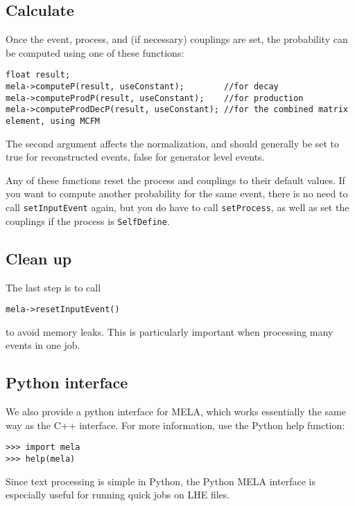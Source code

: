 \documentclass[aps,superscriptaddress,nofootinbib]{revtex4}
\begin{document}
\subsection{Calculate}
Once the event, process, and (if necessary) couplings are set, the probability can be computed using one of these functions:
\begin{verbatim}
float result;
mela->computeP(result, useConstant);        //for decay
mela->computeProdP(result, useConstant);    //for production
mela->computeProdDecP(result, useConstant); //for the combined matrix element, using MCFM
\end{verbatim}
The second argument affects the normalization, and should generally be set to true for reconstructed events, false for generator level events.

Any of these functions reset the process and couplings to their default values.  If you want to compute another probability for the same event, there is no need to call \texttt{setInputEvent} again, but you do have to call \texttt{setProcess}, as well as set the couplings if the process is \texttt{SelfDefine}.

\subsection{Clean up}
The last step is to call
\begin{verbatim}
mela->resetInputEvent()
\end{verbatim}
to avoid memory leaks.  This is particularly important when processing many events in one job.

\subsection{Python interface}
We also provide a python interface for MELA, which works essentially the same way as the C++ interface.  For more information, use the Python help function:
\begin{verbatim}
>>> import mela
>>> help(mela)
\end{verbatim}
Since text processing is simple in Python, the Python MELA interface is especially useful for running quick jobs on LHE files.
\end{document}
